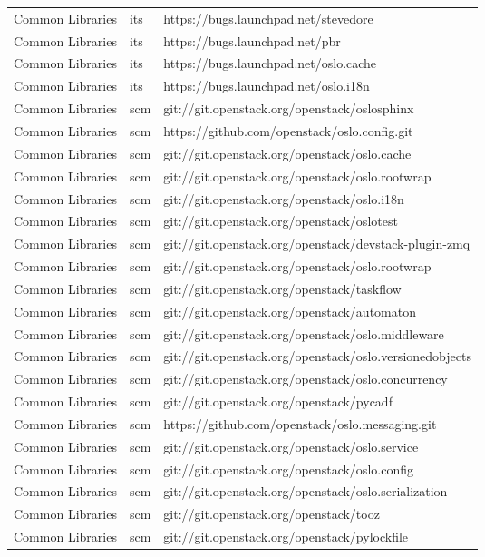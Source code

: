\begin{center}
\begin{longtable}{|p{4cm}|p{1cm}|p{10cm}|}
Common Libraries&its&https://bugs.launchpad.net/stevedore\\ 
Common Libraries&its&https://bugs.launchpad.net/pbr\\ 
Common Libraries&its&https://bugs.launchpad.net/oslo.cache\\ 
Common Libraries&its&https://bugs.launchpad.net/oslo.i18n\\ 
Common Libraries&scm&git://git.openstack.org/openstack/oslosphinx\\ 
Common Libraries&scm&https://github.com/openstack/oslo.config.git\\ 
Common Libraries&scm&git://git.openstack.org/openstack/oslo.cache\\ 
Common Libraries&scm&git://git.openstack.org/openstack/oslo.rootwrap\\ 
Common Libraries&scm&git://git.openstack.org/openstack/oslo.i18n\\ 
Common Libraries&scm&git://git.openstack.org/openstack/oslotest\\ 
Common Libraries&scm&git://git.openstack.org/openstack/devstack-plugin-zmq\\ 
Common Libraries&scm&git://git.openstack.org/openstack/oslo.rootwrap\\ 
Common Libraries&scm&git://git.openstack.org/openstack/taskflow\\ 
Common Libraries&scm&git://git.openstack.org/openstack/automaton\\ 
Common Libraries&scm&git://git.openstack.org/openstack/oslo.middleware\\ 
Common Libraries&scm&git://git.openstack.org/openstack/oslo.versionedobjects\\ 
Common Libraries&scm&git://git.openstack.org/openstack/oslo.concurrency\\ 
Common Libraries&scm&git://git.openstack.org/openstack/pycadf\\ 
Common Libraries&scm&https://github.com/openstack/oslo.messaging.git\\ 
Common Libraries&scm&git://git.openstack.org/openstack/oslo.service\\ 
Common Libraries&scm&git://git.openstack.org/openstack/oslo.config\\ 
Common Libraries&scm&git://git.openstack.org/openstack/oslo.serialization\\ 
Common Libraries&scm&git://git.openstack.org/openstack/tooz\\ 
Common Libraries&scm&git://git.openstack.org/openstack/pylockfile\\ 

\end{longtable}
\end{center}
